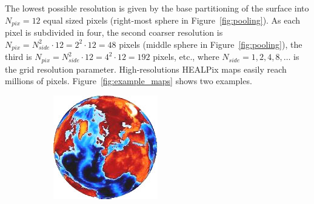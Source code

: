 \documentclass[final,twocolumn,3p,times,authoryear]{elsarticle}
\newcommand{\nati}[1]{{\color[rgb]{.1,.6,.1}{#1}}}
\newcommand{\figref}[1]{Figure~\ref{fig:#1}}
\newcommand{\1}{\b{1}}              %
\newcommand{\0}{\b{0}}              %
\begin{document}
The lowest possible resolution is given by the base partitioning of the surface into $N_{pix} = 12$ equal sized pixels (right-most sphere in \figref{pooling}). As each pixel is subdivided in four, the second coarser resolution is $N_{pix} = N_{side}^2 \cdot 12 = 2^2 \cdot 12 = 48$ pixels (middle sphere in \figref{pooling}), the third is $N_{pix} = N_{side}^2 \cdot 12 = 4^2 \cdot 12 = 192$ pixels, etc., where $N_{side} = 1, 2, 4, 8, \ldots$ is the grid resolution parameter.
High-resolutions HEALPix maps easily reach millions of pixels. \figref{example_maps} shows two examples.
\nati{The figure is beautiful, but should we really show it? If we target cosmologists, we can simply list some type of data. If we target a broader audience, maybe it makes sense to provide some illustration.}

\begin{figure}
	\centering
	\begin{subfigure}[b]{0.45\linewidth}
		\centering
		\includegraphics[width=\linewidth]{figures/exampleEarthTopo}
		\caption{}
		\label{fig:example_earth}
	\end{subfigure}
	\hfill
	\begin{subfigure}[b]{0.45\linewidth}
		\centering

\end{subfigure}
\end{figure}
\end{document}

